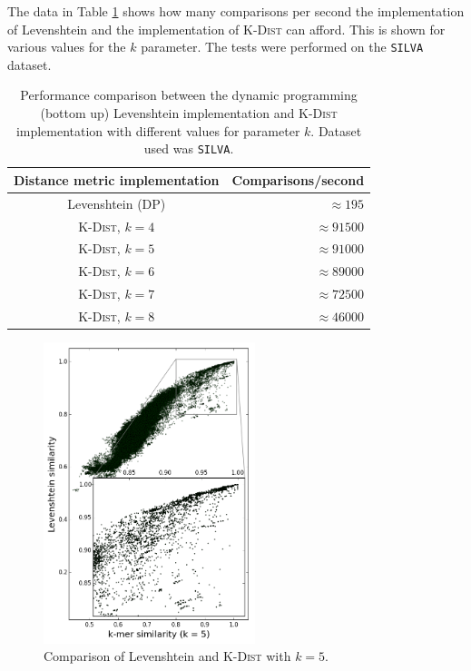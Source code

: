 The data in Table \ref{tab:levenshtein_vs_kdist_performance} shows how many
comparisons per second the implementation of Levenshtein and the implementation
of \textsc{K-Dist} can afford. This is shown for various values for the $k$
parameter. The tests were performed on the \texttt{SILVA} dataset.

\begin{table}[H]
  \centering
  \begin{tabular}{ c | r }
    Distance metric implementation  & Comparisons/second    \\
    \hline \hline
    Levenshtein (DP)                & $\approx \num{195}$   \\ \hline
    \textsc{K-Dist}, $k=4$          & $\approx \num{91500}$ \\ \hline
    \textsc{K-Dist}, $k=5$          & $\approx \num{91000}$ \\ \hline
    \textsc{K-Dist}, $k=6$          & $\approx \num{89000}$ \\ \hline
    \textsc{K-Dist}, $k=7$          & $\approx \num{72500}$ \\ \hline
    \textsc{K-Dist}, $k=8$          & $\approx \num{46000}$ \\
  \end{tabular}
  \caption{Performance comparison between the dynamic programming (bottom up)
    Levenshtein implementation and \textsc{K-Dist} implementation with
    different values for parameter $k$. Dataset used was \texttt{SILVA}.}
  \label{tab:levenshtein_vs_kdist_performance}
\end{table}

\begin{figure}
  \includegraphics[width=0.55\textwidth]{graphics/Levenshtein_K-Dist_k5.png}
  \caption{Comparison of Levenshtein and \textsc{K-Dist} with $k=5$.}
  \label{fig:k-dist_lev_similarity_k5}
\end{figure}

